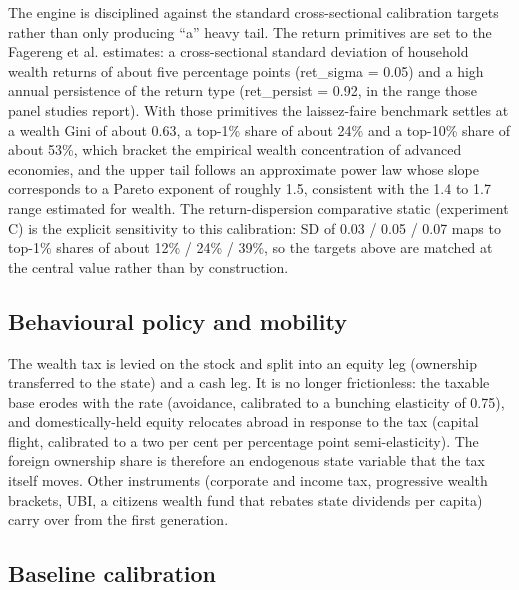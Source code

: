 \documentclass[11pt]{article}
\begin{document}
The engine is disciplined against the standard cross-sectional
calibration targets rather than only producing ``a'' heavy tail. The
return primitives are set to the Fagereng et al. estimates: a
cross-sectional standard deviation of household wealth returns of about
five percentage points (ret\_sigma = 0.05) and a high annual persistence
of the return type (ret\_persist = 0.92, in the range those panel
studies report). With those primitives the laissez-faire benchmark
settles at a wealth Gini of about 0.63, a top-1\% share of about 24\%
and a top-10\% share of about 53\%, which bracket the empirical wealth
concentration of advanced economies, and the upper tail follows an
approximate power law whose slope corresponds to a Pareto exponent of
roughly 1.5, consistent with the 1.4 to 1.7 range estimated for wealth.
The return-dispersion comparative static (experiment C) is the explicit
sensitivity to this calibration: SD of 0.03 / 0.05 / 0.07 maps to
top-1\% shares of about 12\% / 24\% / 39\%, so the targets above are
matched at the central value rather than by construction.

\hypertarget{behavioural-policy-and-mobility}{%
\subsection{Behavioural policy and
mobility}\label{behavioural-policy-and-mobility}}

The wealth tax is levied on the stock and split into an equity leg
(ownership transferred to the state) and a cash leg. It is no longer
frictionless: the taxable base erodes with the rate (avoidance,
calibrated to a bunching elasticity of 0.75), and domestically-held
equity relocates abroad in response to the tax (capital flight,
calibrated to a two per cent per percentage point semi-elasticity). The
foreign ownership share is therefore an endogenous state variable that
the tax itself moves. Other instruments (corporate and income tax,
progressive wealth brackets, UBI, a citizens\textquotesingle{} wealth
fund that rebates state dividends per capita) carry over from the first
generation.

\hypertarget{baseline-calibration}{%
\subsection{Baseline calibration}\label{baseline-calibration}}
\end{document}
